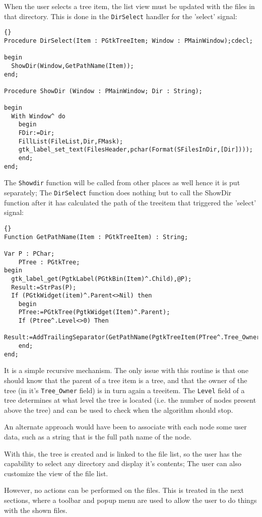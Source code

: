 \documentclass[10pt]{article}
\begin{document}
When the user selects a tree item, the list view must be updated with
the files in that directory. This is done in the \lstinline|DirSelect|
handler for the 'select' signal:
\begin{lstlisting}{}
Procedure DirSelect(Item : PGtkTreeItem; Window : PMainWindow);cdecl;
  
begin
  ShowDir(Window,GetPathName(Item));
end;

Procedure ShowDir (Window : PMainWindow; Dir : String);

begin
  With Window^ do
    begin
    FDir:=Dir;
    FillList(FileList,Dir,FMask);
    gtk_label_set_text(FilesHeader,pchar(Format(SFilesInDir,[Dir])));
    end;
end;

\end{lstlisting}
The \lstinline|Showdir| function will be called from other places as 
well hence it is put separately; The \lstinline|DirSelect| function
does nothing but to call the ShowDir function after it has calculated the
path of the treeitem that triggered the 'select' signal:
\begin{lstlisting}{}
Function GetPathName(Item : PGtkTreeItem) : String;

Var P : PChar;
    PTree : PGtkTree;
begin
  gtk_label_get(PgtkLabel(PGtkBin(Item)^.Child),@P);
  Result:=StrPas(P);
  If (PGtkWidget(item)^.Parent<>Nil) then
    begin
    PTree:=PGtkTree(PgtkWidget(Item)^.Parent);
    If (Ptree^.Level<>0) Then
      Result:=AddTrailingSeparator(GetPathName(PgtkTreeItem(PTree^.Tree_Owner)))+Result
    end;  
end;
\end{lstlisting}
It is a simple recursive mechanism. The only issue with this
routine is that one should know that the parent of a tree item is a tree,
and that the owner of the tree (in it's \lstinline|Tree_Owner| field) is 
in turn again a treeitem. The \lstinline|Level| field of a tree determines
at what level the tree is located (i.e. the number of nodes present above 
the tree) and can be used to check when the algorithm should stop.

An alternate approach would have been to associate with each node some 
user data, such as a string that is the full path name of the node.

With this, the tree is created and is linked to the file list, so the 
user has the capability to select any directory and display it's contents;
The user can also customize the view of the file list. 

However, no actions can be performed on the files. This is treated in the
next sections, where a toolbar and popup menu are used to allow the user to 
do things with the shown files.
\end{document}
